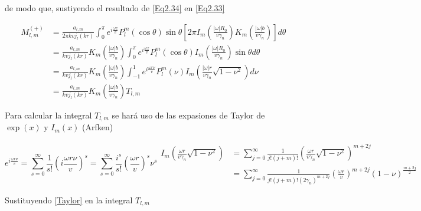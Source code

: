 \documentclass[a4paper,10pt]{article}
\begin{document}
de modo que, sustiyendo el resultado de \eqref{Eq2.34} en \eqref{Eq2.33}

\begin{equation}
\begin{aligned}
M_{l,m}^{(+)}
	&=\frac{a_{l,m}}{2\pi kv j_l(kr)}\int_{0}^{\pi}e^{i\frac{\omega z}{v}}P_l^m(\cos\theta)\sin\theta \left[ 2\pi I_m\left( \frac{|\omega|R_0}{v\gamma_n} \right)K_m\left( \frac{|\omega|b}{v\gamma_n} \right) \right] d\theta	\\
	&=\frac{a_{l,m}}{kv j_l(kr)}K_m\left( \frac{|\omega|b}{v\gamma_n} \right) \int_{0}^{\pi}e^{i\frac{\omega z}{v}}P_l^m(\cos\theta)I_m\left( \frac{|\omega|R_0}{v\gamma_n} \right)\sin\theta d\theta\\
	&=\frac{a_{l,m}}{kv j_l(kr)}K_m\left( \frac{|\omega|b}{v\gamma_n} \right) \int_{-1}^{1}e^{i\frac{\omega r \nu}{v}} P_l^m(\nu) I_m\left( \frac{|\omega|r}{v\gamma_n} \sqrt{1-\nu^2}\right) d\nu	\\
	&=\frac{a_{l,m}}{kv j_l(kr)}K_m\left( \frac{|\omega|b}{v\gamma_n} \right)  T_{l,m}
\end{aligned}
\label{MlmSuma}
\end{equation}

Para calcular la integral $T_{l,m}$ se hará uso de las expasiones de Taylor de $\exp(x)$ y $I_m(x)$ (Arfken)

\begin{subequations}{
\begin{equation}
e^{i\frac{\omega r\nu}{v}}=\sum_{s=0}^{\infty} \frac{1}{s!}\left(i\frac{\omega r\nu}{v} \right)^s=\sum_{s=0}^{\infty} \frac{i^s}{s!}\left(\frac{\omega r}{v} \right)^s\nu^s
\end{equation}
\begin{equation}
\begin{aligned}
I_m\left(\frac{\omega r}{v\gamma_n} \sqrt{1-\nu^2}\right)
	&=	\sum_{j=0}^{\infty}\frac{1}{j!(j+m)!}\left(\frac{\omega r}{v\gamma_n} \sqrt{1-\nu^2}\right)^{m+2j}	\\
	&=	\sum_{j=0}^{\infty}\frac{1}{j!(j+m)!(2\gamma_n)^{m+2j}}\left(\frac{\omega r}{v} \right)^{m+2j}(1-\nu)^{\frac{m+2j}{2}}
\end{aligned}
\end{equation}}
\label{Taylor}
\end{subequations}

Sustituyendo \eqref{Taylor} en la integral $T_{l,m}$
\end{document}
